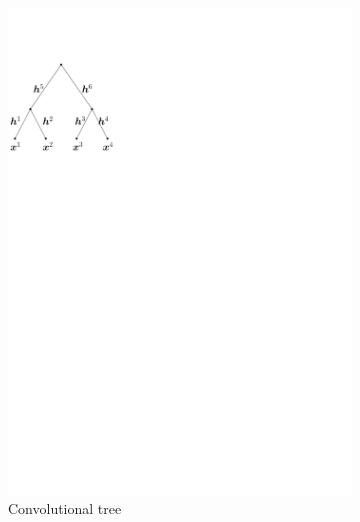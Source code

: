 \begin{figure}[!ht] \centering
\begin{subfigure}[b]{0.30\textwidth}\centering
\includegraphics[width=\textwidth]{figures/pov-tree.pdf}
\caption{Convolutional tree}
\end{subfigure}
\begin{subfigure}[b]{0.69\textwidth}\centering

\end{subfigure}
\end{figure}
